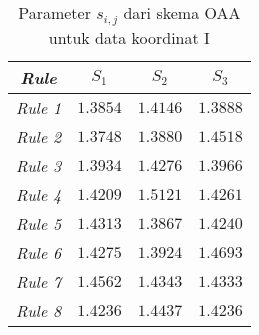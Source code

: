 {\begin{table}[htbp!]
    \centering
    \caption{Parameter $s_{i,j}$ dari skema OAA untuk data koordinat I}
    \label{tab: lam dk1 OAA S}
    \begin{tabular}{crrr}
    \toprule
    \textit{\textbf{Rule}} & \multicolumn{1}{c}{\boldmath{}\textbf{$S_1$}\unboldmath{}} & \multicolumn{1}{c}{\boldmath{}\textbf{$S_2$}\unboldmath{}} & \multicolumn{1}{c}{\boldmath{}\textbf{$S_3$}\unboldmath{}} \\
    \midrule
    \textit{Rule 1} & $\num{1,3854}$ & $\num{1,4146}$ & $\num{1,3888}$ \\
    \textit{Rule 2} & $\num{1,3748}$ & $\num{1,3880}$ & $\num{1,4518}$ \\
    \textit{Rule 3} & $\num{1,3934}$ & $\num{1,4276}$ & $\num{1,3966}$ \\
    \textit{Rule 4 }& $\num{1,4209}$ & $\num{1,5121}$ & $\num{1,4261}$ \\
    \textit{Rule 5} & $\num{1,4313}$ & $\num{1,3867}$ & $\num{1,4240}$ \\
    \textit{Rule 6} & $\num{1,4275}$ & $\num{1,3924}$ & $\num{1,4693}$ \\
    \textit{Rule 7} & $\num{1,4562}$ & $\num{1,4343}$ & $\num{1,4333}$ \\
    \textit{Rule 8} & $\num{1,4236}$ & $\num{1,4437}$ & $\num{1,4236}$ \\
    \bottomrule
    \end{tabular}%
\end{table}

}
